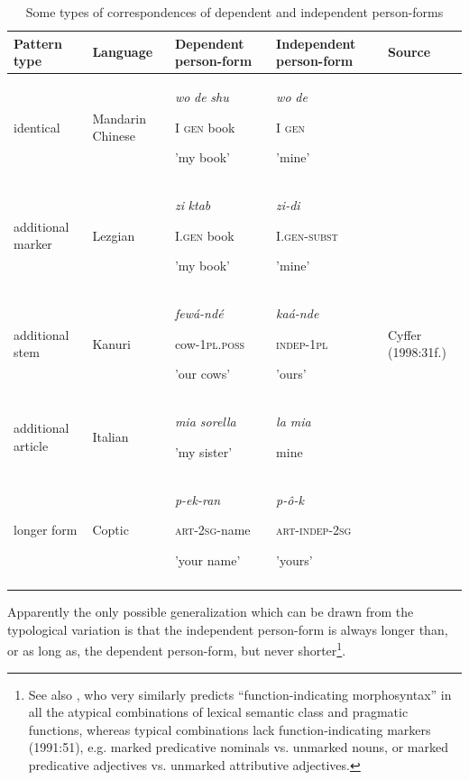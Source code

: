 \documentclass[output=paper]{langsci/langscibook}
\begin{document}
\begin{table}
\begin{tabularx}{\textwidth}{XXXXX}
\lsptoprule

\bfseries Pattern type & \bfseries Language & \bfseries Dependent person-form & \bfseries Independent person-form & \bfseries Source\\
\midrule
identical & Mandarin Chinese & \textit{wo}   \textit{de}  \textit{shu}

I   \textsc{gen}  book

'my book' & \textit{wo}  \textit{de~}

I  \textsc{gen}

'mine' & \\
additional marker & Lezgian & \textit{zi}  \textit{ktab}

I.\textsc{gen}  book

'my book' & \textit{zi-di}

I.\textsc{gen-subst}

'mine' & \citet[110]{Haspelmath1993}\\
additional stem & Kanuri & \textit{fewá-ndé}

cow-\textsc{1pl.poss}

'our cows' & \textit{kaá{}-nde}

\textsc{indep-1pl}

'ours' & Cyffer (1998:31f.)\\
additional article~ & Italian & \textit{mia sorella}

'my sister' & \textit{la mia}

mine & \citet[44,286f]{Schwarze1988}\\
longer form & Coptic & \textit{p-ek-ran}

\textsc{art-2sg}{}-name

'your name' & \textit{p-ô}\textit{{}-k}

\textsc{art-indep-2sg}

'yours' & \citet[277]{Haspelmath2015}\\
\lspbottomrule
\end{tabularx}

\caption{Some types of correspondences of dependent and independent person-forms}
\label{tab:michaelis:1}
\end{table}

Apparently the only possible generalization which can be drawn from the typological variation is that the independent person-form is always longer than, or as long as, the dependent person-form, but never shorter\footnote{See also \citet{Croft1991}, who very similarly predicts “function-indicating morphosyntax” in all the atypical combinations of lexical semantic class and pragmatic functions, whereas typical combinations lack function-indicating markers (1991:51), e.g. marked predicative nominals vs. unmarked nouns, or marked predicative adjectives vs. unmarked attributive adjectives.}.
\end{document}
